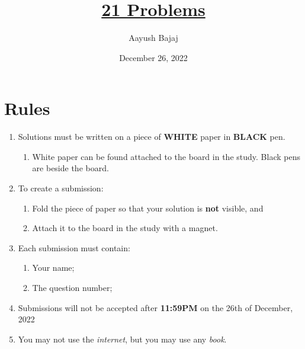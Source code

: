 \documentclass{article}
\title{\underline{\textbf{21 Problems}}}
\author{Aayush Bajaj}
\date{December 26, 2022}
\begin{document}
\maketitle

\bigbreak
\hrulefill
\bigbreak

\noindent{}

\bigbreak
\dotfill

\section{Rules}
    \begin{enumerate}
        \item Solutions must be written on a piece of \textbf{WHITE} paper in \textbf{BLACK} pen.
            \begin{enumerate}[label*=\arabic*.]
                \item White paper can be found attached to the board in the study. Black pens are beside the board.
            \end{enumerate}
        \item To create a submission: 
            \begin{enumerate}[label*=\arabic*.]
                \item Fold the piece of paper so that your solution is \textbf{not} visible, and 
                \item Attach it to the board in the study with a magnet.
            \end{enumerate}
        \item Each submission must contain:
            \begin{enumerate}[label*=\arabic*.]
                \item Your name;
                \item The question number;
            \end{enumerate}
        \item Submissions will not be accepted after \textbf{11:59PM} on the 26th of December, 2022
        \item You may not use the \textit{internet}, but you may use any \textit{book}.
    \end{enumerate}
\end{document}
